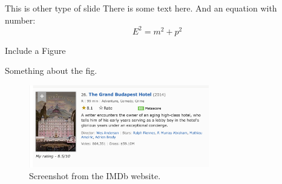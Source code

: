 \documentclass[10pt, xcolor = svgnames]{beamer} %
\begin{document}
\begin{frame}[standout]{This is other type of slide}
There is some text here.
And an equation with number:
\begin{equation}
    E^{2} = m^{2} + p^{2}
\end{equation}
\end{frame}


\begin{frame}{Include a Figure}
\begin{small}
Something about the fig.
\end{small}
\begin{figure}
\centering
\includegraphics[width=0.7\textwidth]{./fig/fig1}
\caption{Screenshot from the IMDb website.}
\label{fig1}
\end{figure}
\end{frame}
\end{document}
